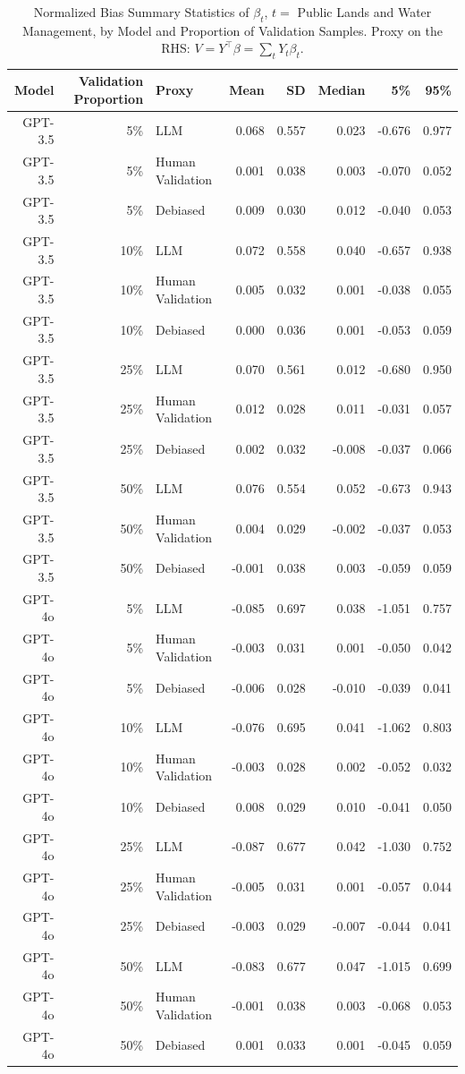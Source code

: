 \begin{table}

\caption{Normalized Bias Summary Statistics of $\beta_{t}$, $t=$ Public Lands and Water Management, by Model and Proportion of Validation Samples.
      Proxy on the RHS: $V = Y^\top \beta = \sum_{t} Y_t \beta_t$.}
\centering
\begin{tabular}[t]{rrlrrrrr}
\toprule
Model & Validation Proportion & Proxy & Mean & SD & Median & 5\% & 95\%\\
\midrule
GPT-3.5 & 5\% & LLM & 0.068 & 0.557 & 0.023 & -0.676 & 0.977\\
GPT-3.5 & 5\% & Human Validation & 0.001 & 0.038 & 0.003 & -0.070 & 0.052\\
GPT-3.5 & 5\% & Debiased & 0.009 & 0.030 & 0.012 & -0.040 & 0.053\\
GPT-3.5 & 10\% & LLM & 0.072 & 0.558 & 0.040 & -0.657 & 0.938\\
GPT-3.5 & 10\% & Human Validation & 0.005 & 0.032 & 0.001 & -0.038 & 0.055\\
GPT-3.5 & 10\% & Debiased & 0.000 & 0.036 & 0.001 & -0.053 & 0.059\\
GPT-3.5 & 25\% & LLM & 0.070 & 0.561 & 0.012 & -0.680 & 0.950\\
GPT-3.5 & 25\% & Human Validation & 0.012 & 0.028 & 0.011 & -0.031 & 0.057\\
GPT-3.5 & 25\% & Debiased & 0.002 & 0.032 & -0.008 & -0.037 & 0.066\\
GPT-3.5 & 50\% & LLM & 0.076 & 0.554 & 0.052 & -0.673 & 0.943\\
GPT-3.5 & 50\% & Human Validation & 0.004 & 0.029 & -0.002 & -0.037 & 0.053\\
GPT-3.5 & 50\% & Debiased & -0.001 & 0.038 & 0.003 & -0.059 & 0.059\\
GPT-4o & 5\% & LLM & -0.085 & 0.697 & 0.038 & -1.051 & 0.757\\
GPT-4o & 5\% & Human Validation & -0.003 & 0.031 & 0.001 & -0.050 & 0.042\\
GPT-4o & 5\% & Debiased & -0.006 & 0.028 & -0.010 & -0.039 & 0.041\\
GPT-4o & 10\% & LLM & -0.076 & 0.695 & 0.041 & -1.062 & 0.803\\
GPT-4o & 10\% & Human Validation & -0.003 & 0.028 & 0.002 & -0.052 & 0.032\\
GPT-4o & 10\% & Debiased & 0.008 & 0.029 & 0.010 & -0.041 & 0.050\\
GPT-4o & 25\% & LLM & -0.087 & 0.677 & 0.042 & -1.030 & 0.752\\
GPT-4o & 25\% & Human Validation & -0.005 & 0.031 & 0.001 & -0.057 & 0.044\\
GPT-4o & 25\% & Debiased & -0.003 & 0.029 & -0.007 & -0.044 & 0.041\\
GPT-4o & 50\% & LLM & -0.083 & 0.677 & 0.047 & -1.015 & 0.699\\
GPT-4o & 50\% & Human Validation & -0.001 & 0.038 & 0.003 & -0.068 & 0.053\\
GPT-4o & 50\% & Debiased & 0.001 & 0.033 & 0.001 & -0.045 & 0.059\\
\bottomrule
\end{tabular}
\end{table}
